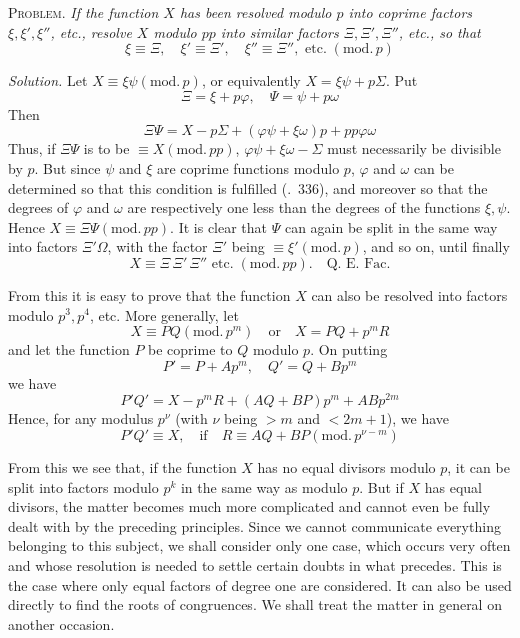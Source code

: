 \textsc{Problem.} \emph{If the function $X$ has been resolved modulo $p$ into coprime factors $\xi,\xi',\xi''$, etc., resolve $X$ modulo $pp$ into similar factors $\Xi,\Xi',\Xi''$, etc., so that}
\[
\xi\equiv\Xi,\quad\xi'\equiv\Xi',\quad\xi''\equiv\Xi'',\text{ etc.}\;(\mathrm{mod.}\,p)
\]

\emph{Solution.} Let $X\equiv\xi\psi(\mathrm{mod.}\,p)$, or equivalently $X=\xi\psi+p\Sigma$. Put
\[
\Xi=\xi+p\varphi,\quad\Psi=\psi+p\omega
\]
Then
\[
\Xi\Psi=X-p\Sigma+(\varphi\psi+\xi\omega)p+pp\varphi\omega
\]
Thus, if $\Xi\Psi$ is to be $\equiv X(\mathrm{mod.}\,pp)$, $\varphi\psi+\xi\omega-\Sigma$ must necessarily be divisible by $p$. But since $\psi$ and $\xi$ are coprime functions modulo $p$, $\varphi$ and $\omega$ can be determined so that this condition is fulfilled (\textsection.\ 336), and moreover so that the degrees of $\varphi$ and $\omega$ are respectively one less than the degrees of the functions $\xi,\psi$. Hence $X\equiv\Xi\Psi(\mathrm{mod.}\,pp)$. It is clear that $\Psi$ can again be split in the same way into factors $\Xi'\Omega$, with the factor $\Xi'$ being $\equiv\xi'(\mathrm{mod.}\,p)$, and so on, until finally
\[
X\equiv\Xi\,\Xi'\,\Xi''\text{ etc.}\;(\mathrm{mod.}\,pp).\quad\text{Q. E. Fac.}
\]

From this it is easy to prove that the function $X$ can also be resolved into factors modulo $p^3,p^4$, etc. More generally, let
\[
X\equiv PQ(\mathrm{mod.}\,p^m)\quad\text{or}\quad X=PQ+p^mR
\]
and let the function $P$ be coprime to $Q$ modulo $p$. On putting
\[
P'=P+Ap^m,\quad Q'=Q+Bp^m
\]
we have
\[
P'Q'=X-p^mR+(AQ+BP)p^m+ABp^{2m}
\]
Hence, for any modulus $p^\nu$ (with $\nu$ being $>m$ and $<2m+1$), we have
\[
P'Q'\equiv X,\quad\text{if}\quad R\equiv AQ+BP(\mathrm{mod.}\,p^{\nu-m})
\]

From this we see that, if the function $X$ has no equal divisors modulo $p$, it can be split into factors modulo $p^k$ in the same way as modulo $p$. But if $X$ has equal divisors, the matter becomes much more complicated and cannot even be fully dealt with by the preceding principles. Since we cannot communicate everything belonging to this subject, we shall consider only one case, which occurs very often and whose resolution is needed to settle certain doubts in what precedes. This is the case where only equal factors of degree one are considered. It can also be used directly to find the roots of congruences. We shall treat the matter in general on another occasion.

